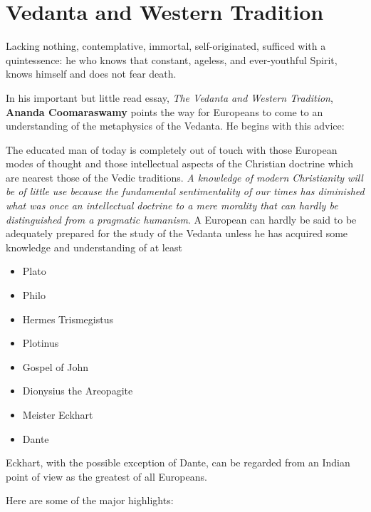 \section{Vedanta and Western Tradition}

\label{sec:VedantaWesternTradition}

\begin{quotex}
Lacking nothing, contemplative, immortal, self-originated, sufficed with a quintessence: he who knows that constant, ageless, and ever-youthful Spirit, knows himself and does not fear death.


\end{quotex}
In his important but little read essay, \emph{The Vedanta and Western Tradition}, \textbf{Ananda Coomaraswamy} points the way for Europeans to come to an understanding of the metaphysics of the Vedanta. He begins with this advice:

\begin{quotex}
The educated man of today is completely out of touch with those European modes of thought and those intellectual aspects of the Christian doctrine which are nearest those of the Vedic traditions. \emph{A knowledge of modern Christianity will be of little use because the fundamental sentimentality of our times has diminished what was once an intellectual doctrine to a mere morality that can hardly be distinguished from a pragmatic humanism}. A European can hardly be said to be adequately prepared for the study of the Vedanta unless he has acquired some knowledge and understanding of at least

\begin{itemize}
\item Plato 
\item Philo 
\item Hermes Trismegistus 
\item Plotinus 
\item Gospel of John 
\item Dionysius the Areopagite 
\item Meister Eckhart 
\item Dante 
\end{itemize}
Eckhart, with the possible exception of Dante, can be regarded from an Indian point of view as the greatest of all Europeans. 

\end{quotex}
Here are some of the major highlights:

